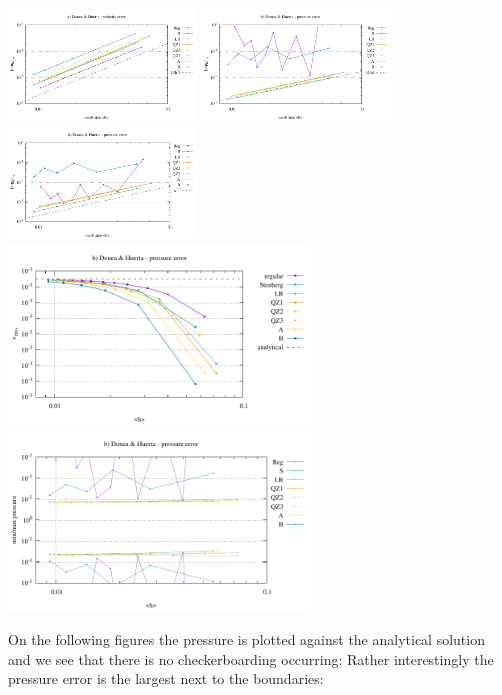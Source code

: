 \begin{center}
\includegraphics[width=5cm]{python_codes/fieldstone_78/results/mms_dh/errors_V.pdf}
\includegraphics[width=5cm]{python_codes/fieldstone_78/results/mms_dh/errors_P.pdf}
\includegraphics[width=5cm]{python_codes/fieldstone_78/results/mms_dh/errors_Q.pdf}\\
\includegraphics[width=8cm]{python_codes/fieldstone_78/results/mms_dh/vrms.pdf}
\includegraphics[width=8cm]{python_codes/fieldstone_78/results/mms_dh/pstats.pdf}
\end{center}

On the following figures the pressure is plotted against the analytical solution and 
we see that there is no checkerboarding occurring:
Rather interestingly the pressure error is the largest next to the boundaries:

